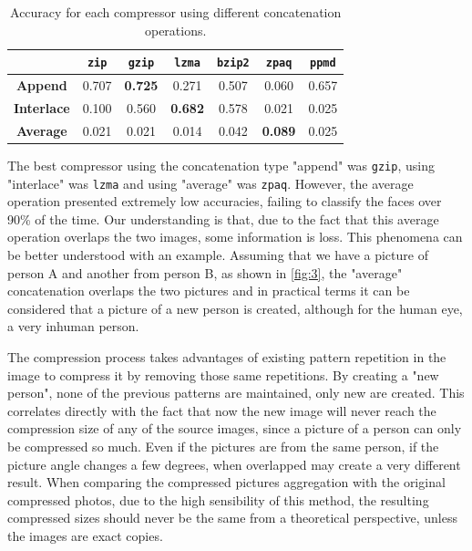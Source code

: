 \documentclass[12pt]{article}
\begin{document}
\begin{table}[h!]
\centering
\begin{tabular}{@{}c|cccccc@{}}
                   & \textbf{\texttt{zip}} & \textbf{\texttt{gzip}} & \textbf{\texttt{lzma}} & \textbf{\texttt{bzip2}} & \textbf{\texttt{zpaq}} & \textbf{\texttt{ppmd}}\\ \midrule
\textbf{Append}    & 0.707     & \textbf{0.725}   & 0.271           & 0.507     & 0.060           & 0.657 \\
\textbf{Interlace} & 0.100     & 0.560            & \textbf{0.682}  & 0.578     & 0.021           & 0.025 \\ 
\textbf{Average}   & 0.021     & 0.021            & 0.014           & 0.042     & \textbf{0.089}  & 0.025 \\ 
\end{tabular}
\vspace{5pt}
\caption{Accuracy for each compressor using different concatenation operations.}
\label{tab:1}
\end{table}

The best compressor using the concatenation type "append" was \texttt{gzip}, using "interlace" was \texttt{lzma} and using "average" was \texttt{zpaq}.
However, the average operation presented extremely low accuracies, failing to classify the faces over 90\% of the time.
Our understanding is that, due to the fact that this average operation overlaps the two images, some information is loss. 
This phenomena can be better understood with an example. 
Assuming that we have a picture of person A and another from person B, as shown in \ref{fig:3}, the "average" concatenation overlaps the two pictures and in 
practical terms it can be considered that a picture of a new person is created, although for the human eye, a very inhuman person. 

The compression process takes advantages of existing pattern repetition in the image to compress it by removing those same repetitions. 
By creating a "new person", none of the previous patterns are maintained, only new are created. 
This correlates directly with the fact that now the new image will never reach the compression size of any of the source images, since a picture of a person 
can only be compressed so much. 
Even if the pictures are from the same person, if the picture angle changes a few degrees, when overlapped may create a very different result. 
When comparing the compressed pictures aggregation with the original compressed photos, due to the high sensibility of this method, the resulting compressed 
sizes should never be the same from a theoretical perspective, unless the images are exact copies.
\end{document}
